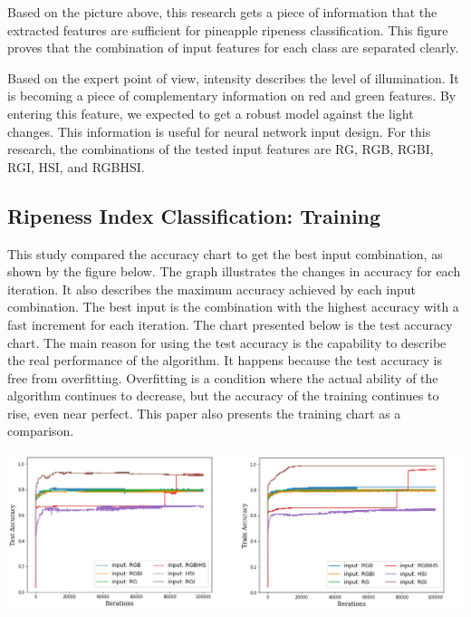 \documentclass[11pt]{article}
\begin{document}
\begin{linenumbers}
\begin{center}
\end{center}
Based on the picture above, this research gets a piece of information that the extracted features are sufficient for pineapple ripeness classification. This figure proves that the combination of input features for each class are separated clearly.

Based on the expert point of view, intensity describes the level of illumination. It is becoming a piece of complementary information on red and green features. By entering this feature, we expected to get a robust model against the light changes. This information is useful for neural network input design. For this research, the combinations of the tested input features are RG, RGB, RGBI, RGI, HSI, and RGBHSI.

\subsection{Ripeness Index Classification: Training}
This study compared the accuracy chart to get the best input combination, as shown by the figure below. The graph illustrates the changes in accuracy for each iteration. It also describes the maximum accuracy achieved by each input combination. The best input is the combination with the highest accuracy with a fast increment for each iteration. The chart presented below is the test accuracy chart. The main reason for using the test accuracy is the capability to describe the real performance of the algorithm. It happens because the test accuracy is free from overfitting. Overfitting is a condition where the actual ability of the algorithm continues to decrease, but the accuracy of the training continues to rise, even near perfect. This paper also presents the training chart as a comparison.

\begin{center}
	\includegraphics[scale=0.65]{images/test-result}
\end{center}


\end{linenumbers}
\end{document}
